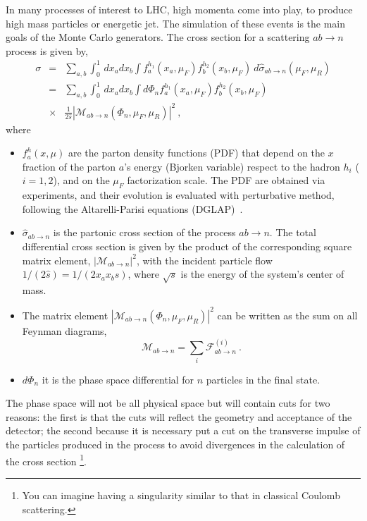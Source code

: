 In many processes of interest to LHC, high momenta come into play, to produce high mass particles or  energetic jet. The simulation of these events is the main goals of the Monte Carlo generators.
The cross section for a scattering $ ab \rightarrow n $ process is given \cite{Buckley:2011ms} by,
\begin{eqnarray}
 \sigma & = & \sum_{a,b}  \int_{0}^{1} \, dx_{a} dx_b \int f_{a}^{h_1} (x_a , \mu_F) f_{b}^{h_2} (x_b , \mu_F) \: d \hat{\sigma}_{ab \rightarrow n}(\mu_F , \mu_R)  \nonumber \\
& = & \sum_{a,b}  \int_{0}^{1} \, dx_{a} dx_b \int d \Phi_n  f_{a}^{h_1} (x_a , \mu_F) f_{b}^{h_2} (x_b , \mu_F) \nonumber \\
 & \times& \frac{1}{2\hat{s}} 
 | \mathcal{M}_{ab \rightarrow n} 
(\Phi_n , \mu_F , \mu_R)|^2  \: \mbox{,} \end{eqnarray}
where
\begin{itemize}
\item $f_{a}^{h} (x , \mu)$ are the parton density functions (PDF) that depend on the $x$ fraction of the parton $a$'s energy (Bjorken variable) respect to the 
hadron $h_i$ ($i=1,2$), and on the $\mu_F $ factorization scale. The PDF are obtained via experiments, and their evolution is evaluated with perturbative method, following the Altarelli-Parisi equations (DGLAP)~\cite{Altarelli:1977zs}.
\item $\hat {\sigma}_ {ab\rightarrow n} $ is the partonic cross section of the process $ ab \rightarrow n $.
The total differential cross section is given by the product of the corresponding square matrix element, $ | \mathcal {M}_{ab \rightarrow n} |^2 $, 
with  the incident particle flow $ 1 / (2 \hat{s}) = 1 / (2 x_a x_b s) $, where $ \sqrt{s} $ is the energy of the system's center of mass.
\item The matrix element $| \mathcal{M}_{ab \rightarrow n}  (\Phi_n , \mu_F , \mu_R) |^2 $  can be written as the sum on all Feynman diagrams,
\begin{equation}
\mathcal{M}_{ab \rightarrow n}= \sum_{i} \mathcal{F}_{ab \rightarrow n}^{(i)} \: \mbox{.} \end{equation}
\item $d\Phi_n$ it is the phase space differential for $ n $ particles in the final state.
\end{itemize}
The phase space will not be all physical space  but will contain cuts for two reasons: the first is that  the cuts will reflect the geometry and acceptance of the detector; the second because it is necessary put a cut on the transverse impulse of the particles produced in the process to avoid divergences in the calculation of the cross section \footnote {You can imagine having a singularity similar to that  in classical Coulomb scattering.}.
